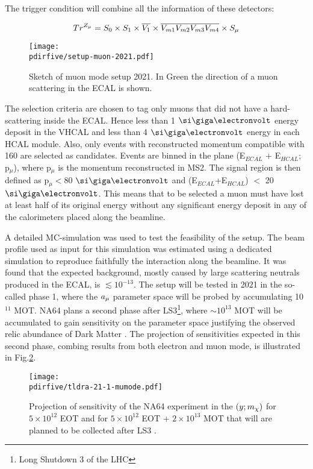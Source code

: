 The trigger condition will combine all the information of these detectors:

\begin{equation}
\label{eq:trigger-mumode}
Tr^{Z_{\mu}} = S_0 \times S_1 \times \overline{V_1} \times \overline{V_{m1}}\overline{V_{m2}}\overline{V_{m3}}\overline{V_{m4}}\times S_{\mu}
\end{equation}

\begin{figure}[bth!]
  \centering
  \texttt{[image: \\pdirfive/setup-muon-2021.pdf]}
  \caption[Sketch of muon mode setup 2021]{Sketch of muon mode setup 2021. In Green the direction of a muon scattering in the ECAL is shown.}
  \label{fig:muon-mode-setup}
\end{figure}

The selection criteria are chosen to tag only muons that did not have a hard-scattering inside the ECAL. Hence less than 1 $\gev$ energy deposit in the VHCAL and less than 4 $\gev$ energy in each HCAL module. Also, only events with reconstructed momentum compatible with 160 \gev are selected as candidates. Events are binned in the plane (E$_{ECAL}$ + E$_{HCAL}$; p$_{\mu}$), where p$_{\mu}$ is the momentum reconstructed in MS2. The signal region is then defined as p$_{\mu} <$80 $\gev$ and (E$_{ECAL}$+E$_{HCAL}$) $<$ 20 $\gev$. This means that to be selected a muon must have lost at least half of its original energy without any significant energy deposit in any of the calorimeters placed along the beamline.

A detailed MC-simulation was used to test the feasibility of the setup. The beam profile used as input for this simulation was estimated using a dedicated simulation to reproduce faithfully the interaction along the beamline. It was found that the expected background, mostly caused by large scattering neutrals produced in the ECAL, is $\lesssim 10^{-13}$. The setup will be tested in 2021 in the so-called phase 1, where the $a_{\mu}$ parameter space will be probed by accumulating 10$^{11}$ MOT. NA64 plans a second phase after LS3\footnote{Long Shutdown 3 of the LHC}, where $\sim 10^{13}$ MOT will be accumulated to gain sensitivity on the parameter space justifying the observed relic abundance of Dark Matter \cite{Gninenko:2640930}. The projection of sensitivities expected in this second phase, combing results from both electron and muon mode, is illustrated in Fig.\ref{fig:dmyplane-mumode}.

\begin{figure}[bth!]
  \centering
  \texttt{[image: \\pdirfive/tldra-21-1-mumode.pdf]}
  \caption[sensitivity projection for invisible mode + muon mode 2021]{Projection of sensitivity of the NA64 experiment in the $(y;m_{\chi})$ for $5 \times 10^{12}$ EOT and for $5 \times 10^{12}$ EOT + $2 \times 10^{13}$ MOT that will are planned to be collected after LS3 \cite{Gninenko:2019qiv}.}
  \label{fig:dmyplane-mumode}
\end{figure}


